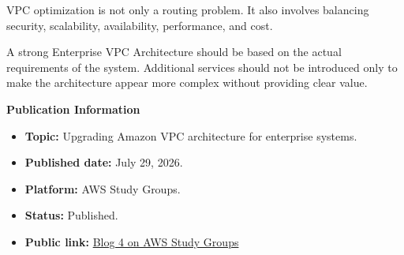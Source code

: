 VPC optimization is not only a routing problem. It also involves
balancing security, scalability, availability, performance, and cost.

A strong Enterprise VPC Architecture should be based on the actual
requirements of the system. Additional services should not be introduced
only to make the architecture appear more complex without providing
clear value.

\vspace{0.5em}\noindent\textbf{Publication Information}\par

\begin{itemize}
\tightlist
\item
  \textbf{Topic:} Upgrading Amazon VPC architecture for enterprise
  systems.
\item
  \textbf{Published date:} July 29, 2026.
\item
  \textbf{Platform:} AWS Study Groups.
\item
  \textbf{Status:} Published.
\item
  \textbf{Public link:}
  \href{https://www.facebook.com/groups/awsstudygroupfcj/permalink/2225997548165205/\#}{Blog
  4 on AWS Study Groups}
\end{itemize}

